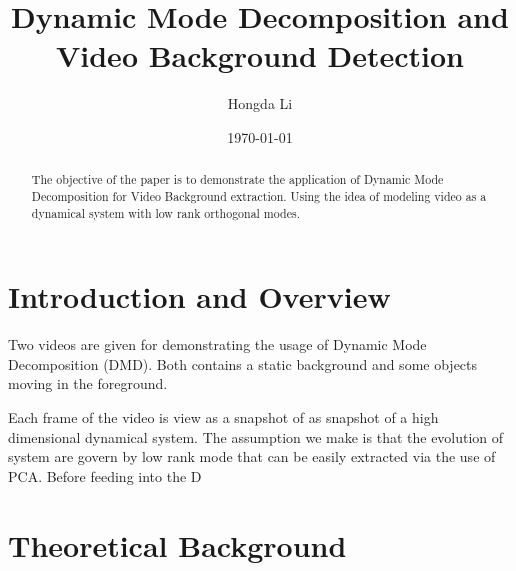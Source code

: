\documentclass{article}
\title{Dynamic Mode Decomposition and Video Background Detection}
\author{Hongda Li}
\date{\today}
\begin{document}
\maketitle

\begin{abstract}
   The objective of the paper is to demonstrate the application of Dynamic Mode Decomposition for Video Background extraction. Using the idea of modeling video as a dynamical system with low rank orthogonal modes. 
\end{abstract}

\section{Introduction and Overview}
    \hspace{1.1em}
    Two videos are given for demonstrating the usage of Dynamic Mode Decomposition (DMD). Both contains a static background and some objects moving in the foreground. 
    \par
    Each frame of the video is view as a snapshot of as snapshot of a high dimensional dynamical system. The assumption we make is that the evolution of system are govern by low rank mode that can be easily extracted via the use of PCA. Before feeding into the D

\section{Theoretical Background}
\end{document}
